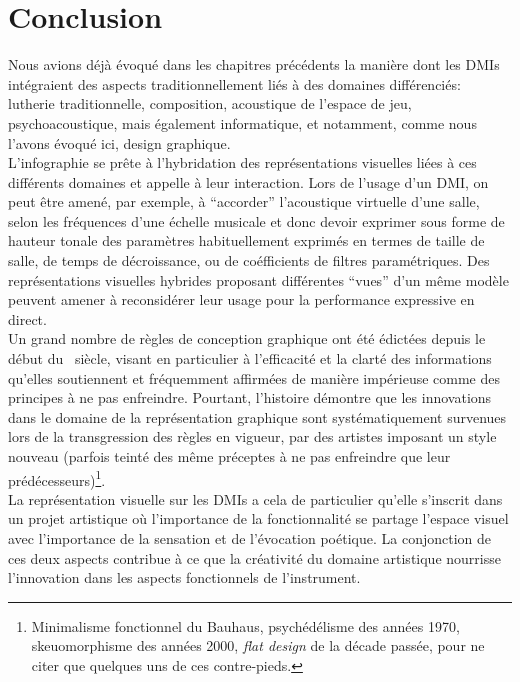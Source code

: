 \section{Conclusion}

\noindent Nous avions déjà évoqué dans les chapitres précédents la manière dont les \glspl{DMI} intégraient des aspects traditionnellement liés à des domaines différenciés: lutherie traditionnelle, composition, acoustique de l'espace de jeu, psychoacoustique, mais également informatique, et notamment, comme nous l'avons évoqué ici, design graphique.\\
\indent L'infographie se prête à l'hybridation des représentations visuelles liées à ces différents domaines et appelle à leur interaction. Lors de l'usage d'un \gls{DMI}, on peut être amené, par exemple, à ``accorder'' l'acoustique virtuelle d'une salle, selon les fréquences d'une échelle musicale et donc devoir exprimer sous forme de hauteur tonale des paramètres habituellement exprimés en termes de taille de salle, de temps de décroissance, ou de coéfficients de filtres paramétriques. Des représentations visuelles hybrides proposant différentes ``vues'' d'un même modèle peuvent amener à reconsidérer leur usage pour la performance expressive en direct.\\
\indent Un grand nombre de règles de conception graphique ont été édictées depuis le début du ~siècle, visant en particulier à l'efficacité et la clarté des informations qu'elles soutiennent et fréquemment affirmées de manière impérieuse comme des principes à ne pas enfreindre. Pourtant, l'histoire démontre que les innovations dans le domaine de la représentation graphique sont systématiquement survenues lors de la transgression des règles en vigueur, par des artistes imposant un style nouveau (parfois teinté des même préceptes à ne pas enfreindre que leur prédécesseurs)\footnote{Minimalisme fonctionnel du Bauhaus, psychédélisme des années 1970, skeuomorphisme des années 2000, \textit{flat design} de la décade passée, pour ne citer que quelques uns de ces contre-pieds.}.\\
\noindent La représentation visuelle sur les \glspl{DMI} a cela de particulier qu'elle s'inscrit dans un projet artistique où l'importance de la fonctionnalité se partage l'espace visuel avec l'importance de la sensation et de l'évocation poétique. La conjonction de ces deux aspects contribue à ce que la créativité du domaine artistique nourrisse l'innovation dans les aspects fonctionnels de l'instrument.\\
